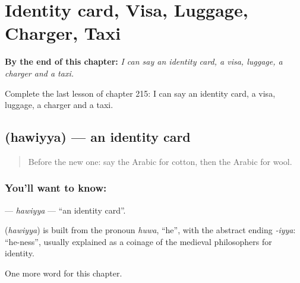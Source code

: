 
\chapter{Identity card, Visa, Luggage, Charger, Taxi}
\label{ch:ar-identity-card-visa-luggage-charger-taxi}

\begin{chapteropening}
\textbf{By the end of this chapter:} \emph{I can say an identity card, a visa, luggage, a charger and a taxi.}

Complete the last lesson of chapter 215: I can say an identity card, a visa, luggage, a charger and a taxi.
\end{chapteropening}

\section[\texorpdfstring{\ar{هوية} (hawiyya)}{هوية (hawiyya)}]{ (hawiyya) — an identity card}

\label{lesson:AR-C215-hawiyya}



\begin{quote}
Before the new one: say the Arabic for cotton, then the Arabic for wool.
\end{quote}

\subsection*{You'll want to know: }
\textbf{} — \emph{hawiyya} — \textquotedblleft{}an identity card\textquotedblright{}.

\begin{cousinweb}
\textbf{} (\emph{hawiyya}) is built from the pronoun \emph{huwa}, \textquotedblleft{}he\textquotedblright{}, with the abstract ending \emph{-iyya}: \textquotedblleft{}he-ness\textquotedblright{}, usually explained as a coinage of the medieval philosophers for identity.
\end{cousinweb}

\begin{grammarlens}[title={What you've built}]
One more word for this chapter.
\end{grammarlens}

